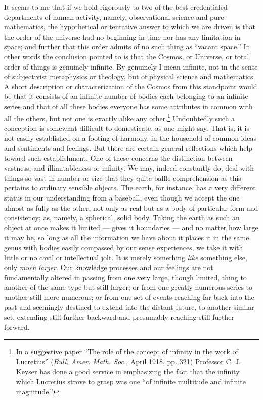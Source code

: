 \documentclass[a4paper, 11pt, oneside, polutonikogreek, english]{article}
\begin{document}
It seems to me that if we hold rigorously to two of the best credentialed departments of human activity, namely, observational science and pure mathematics, the hypothetical or tentative answer to which we are driven is that the order of the universe had no beginning in time nor has any limitation in space; and further that this order admits of no such thing as ``vacant space.'' In other words the conclusion pointed to is that the Cosmos, or Universe, or total order of things is genuinely infinite. By genuinely I mean infinite, not in the sense of subjectivist metaphysics or theology, but of physical science and mathematics. A short description or characterization of the Cosmos from this standpoint would be that it consists of an infinite number of bodies each belonging to an infinite series and that of all these bodies everyone has some attributes in common with all the others, but not one is exactly alike any other.\footnote{In a suggestive paper ``The role of the concept of infinity in the work of Lucretius'' (\emph{Bull. Amer. Math. Soc.}, April 1918, pp. 321) Professor C. J. Keyser has done a good service in emphasizing the fact that the infinity which Lucretius strove to grasp was one ``of infinite multitude and infinite magnitude.''} Undoubtedly such a conception is somewhat difficult to domesticate, as one might say. That is, it is not easily established on a footing of harmony, in the household of common ideas and sentiments and feelings. But there are certain general reflections which help toward such establishment. One of these concerns the distinction between vastness, and illimitableness or infinity. We may, indeed constantly do, deal with things so vast in number or size that they quite baffle comprehension as this pertains to ordinary sensible objects. The earth, for instance, has a very different status in our understanding from a baseball, even though we accept the one almost as fully as the other, not only as real but as a body of particular form and consistency; as, namely, a spherical, solid body. Taking the earth as such an object at once makes it limited --- gives it boundaries --- and no matter how large it may be, so long as all the information we have about it places it in the same genus with bodies easily compassed by our sense experiences, we take it with little or no cavil or intellectual jolt. It is merely something \emph{like} something else, only \emph{much larger}. Our knowledge processes and our feelings are not fundamentally altered in passing from one very large, though limited, thing to another of the same type but still larger; or from one greatly numerous series to another still more numerous; or from one set of events reaching far back into the past and seemingly destined to extend into the distant future, to another similar set, extending still further backward and presumably reaching still further forward.
\end{document}
